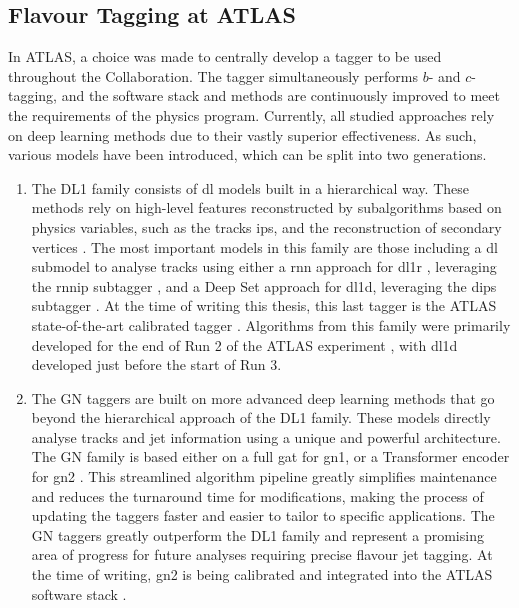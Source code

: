 \subsection{Flavour Tagging at ATLAS}
In ATLAS, a choice was made to centrally develop a tagger to be used throughout the Collaboration. The tagger simultaneously performs $b$- and $c$-tagging, and the software stack and methods are continuously improved to meet the requirements of the physics program. Currently, all studied approaches rely on deep learning methods due to their vastly superior effectiveness. As such, various models have been introduced, which can be split into two generations. 
\begin{enumerate}
  \item The DL1 family consists of \gls{dl} models built in a hierarchical way. These methods rely on high-level features reconstructed by subalgorithms based on physics variables, such as the tracks \glspl{ip}, and the reconstruction of secondary vertices \cite{ATL-PHYS-PUB-2015-022}. The most important models in this family are those including a \gls{dl} submodel to analyse tracks using either a \gls{rnn} approach for \gls{dl1r} \cite{ATLAS:2017bcq}, leveraging the \gls{rnnip} subtagger \cite{ATL-PHYS-PUB-2017-003}, and a Deep Set approach for \gls{dl1d}, leveraging the \gls{dips} subtagger \cite{ATL-PHYS-PUB-2020-014}. At the time of writing this thesis, this last tagger is the ATLAS state-of-the-art calibrated tagger \cite{ATL-SOFT-PUB-2021-001}. Algorithms from this family were primarily developed for the end of Run 2 of the ATLAS experiment \cite{atlas:FTAGRUN2}, with \gls{dl1d} developed just before the start of Run 3.
  \item The GN taggers are built on more advanced deep learning methods that go beyond the hierarchical approach of the DL1 family. These models directly analyse tracks and jet information using a unique and powerful architecture. The GN family is based either on a full \gls{gat} for \gls{gn1}, or a Transformer encoder for \gls{gn2} \cite{ATL-PHYS-PUB-2022-027, ATL-PLOT-FTAG-2023-01, duperrin2023flavour}. This streamlined algorithm pipeline greatly simplifies maintenance and reduces the turnaround time for modifications, making the process of updating the taggers faster and easier to tailor to specific applications. The GN taggers greatly outperform the DL1 family and represent a promising area of progress for future analyses requiring precise flavour jet tagging. At the time of writing, \gls{gn2} is being calibrated and integrated into the ATLAS software stack \cite{ATL-SOFT-PUB-2021-001}.  
\end{enumerate}

